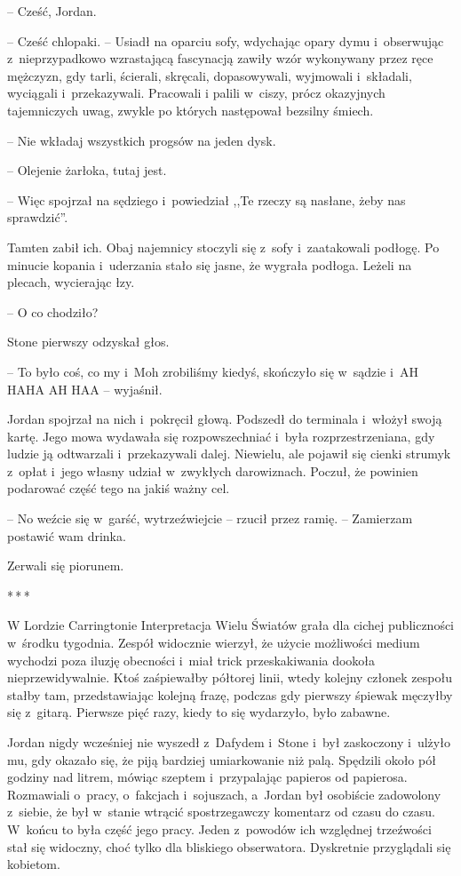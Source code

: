 \documentclass[oneside,polish,11pt,sfheadings]{mwbk}
\newcommand{\threeast}{\bigskip\par\centerline{*\,*\,*}\medskip\par}%
\begin{document}
-- Cześć, Jordan.

-- Cześć chlopaki. -- Usiadł na oparciu sofy, wdychając opary dymu i~obserwując z~nieprzypadkowo wzrastającą fascynacją zawiły wzór
wykonywany przez ręce mężczyzn, gdy tarli, ścierali, skręcali,
dopasowywali, wyjmowali i~składali, wyciągali i~przekazywali. Pracowali
i palili w~ciszy, prócz okazyjnych tajemniczych uwag, zwykle po których
następował bezsilny śmiech.

-- Nie wkładaj wszystkich progsów na jeden dysk.

-- Olejenie żarłoka, tutaj jest.

-- Więc spojrzał na sędziego i~powiedział ,,Te rzeczy są nasłane, żeby nas
sprawdzić''.

Tamten zabił ich. Obaj najemnicy stoczyli się z~sofy i~zaatakowali
podłogę. Po minucie kopania i~uderzania stało się jasne, że wygrała
podłoga. Leżeli na plecach, wycierając łzy.

-- O co chodziło?

Stone pierwszy odzyskał głos.

-- To było coś, co my i~Moh zrobiliśmy kiedyś, skończyło się w~sądzie i~AH HAHA AH HAA -- wyjaśnił.

Jordan spojrzał na nich i~pokręcił głową. Podszedł do terminala i~włożył
swoją kartę. Jego mowa wydawała się rozpowszechniać i~była
rozprzestrzeniana, gdy ludzie ją odtwarzali i~przekazywali dalej.
Niewielu, ale pojawił się cienki strumyk z~opłat i~jego własny udział w~zwykłych darowiznach. Poczuł, że powinien podarować część tego na jakiś
ważny cel.

-- No weźcie się w~garść, wytrzeźwiejcie -- rzucił przez ramię. -- Zamierzam postawić wam drinka.

Zerwali się piorunem.
  \threeast 

W Lordzie Carringtonie Interpretacja Wielu Światów grała dla cichej
publiczności w~środku tygodnia. Zespół widocznie wierzył, że użycie
możliwości medium wychodzi poza iluzję obecności i~miał trick
przeskakiwania dookoła nieprzewidywalnie. Ktoś zaśpiewałby półtorej
linii, wtedy kolejny członek zespołu stałby tam, przedstawiając kolejną
frazę, podczas gdy pierwszy śpiewak męczyłby się z~gitarą. Pierwsze pięć
razy, kiedy to się wydarzyło, było zabawne.

Jordan nigdy wcześniej nie wyszedł z~Dafydem i~Stone i~był zaskoczony i~ulżyło mu, gdy okazało się, że piją bardziej umiarkowanie niż palą.
Spędzili około pół godziny nad litrem, mówiąc szeptem i~przypalając
papieros od papierosa. Rozmawiali o~pracy, o~fakcjach i~sojuszach, a~Jordan był osobiście zadowolony z~siebie, że był w~stanie wtrącić
spostrzegawczy komentarz od czasu do czasu. W~końcu to była część jego
pracy. Jeden z~powodów ich względnej trzeźwości stał się widoczny, choć
tylko dla bliskiego obserwatora. Dyskretnie przyglądali się kobietom.
\end{document}
